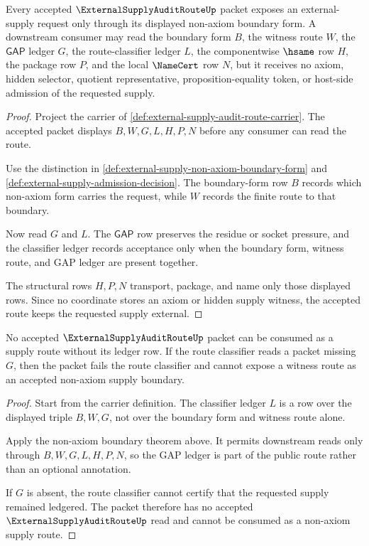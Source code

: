 \begin{theorem}
\label{thm:external-supply-audit-route-nonaxiom-boundary}
Every accepted $\ExternalSupplyAuditRouteUp$ packet exposes an external-supply request only through its displayed non-axiom boundary form. A downstream consumer may read the boundary form $B$, the witness route $W$, the $\mathsf{GAP}$ ledger $G$, the route-classifier ledger $L$, the componentwise $\hsame$ row $H$, the package row $P$, and the local $\NameCert$ row $N$, but it receives no axiom, hidden selector, quotient representative, proposition-equality token, or host-side admission of the requested supply.
\end{theorem}
\begin{proof}
Project the carrier of \autoref{def:external-supply-audit-route-carrier}. The accepted packet displays $B,W,G,L,H,P,N$ before any consumer can read the route.

Use the distinction in \autoref{def:external-supply-non-axiom-boundary-form} and \autoref{def:external-supply-admission-decision}. The boundary-form row $B$ records which non-axiom form carries the request, while $W$ records the finite route to that boundary.

Now read $G$ and $L$. The $\mathsf{GAP}$ row preserves the residue or socket pressure, and the classifier ledger records acceptance only when the boundary form, witness route, and GAP ledger are present together.

The structural rows $H,P,N$ transport, package, and name only those displayed rows. Since no coordinate stores an axiom or hidden supply witness, the accepted route keeps the requested supply external.
\end{proof}

\begin{theorem}
\label{thm:external-supply-audit-route-ledger-nonescape}
No accepted $\ExternalSupplyAuditRouteUp$ packet can be consumed as a supply route without its ledger row. If the route classifier reads a packet missing $G$, then the packet fails the route classifier and cannot expose a witness route as an accepted non-axiom supply boundary.
\end{theorem}
\begin{proof}
Start from the carrier definition. The classifier ledger $L$ is a row over the displayed triple $B,W,G$, not over the boundary form and witness route alone.

Apply the non-axiom boundary theorem above. It permits downstream reads only through $B,W,G,L,H,P,N$, so the GAP ledger is part of the public route rather than an optional annotation.

If $G$ is absent, the route classifier cannot certify that the requested supply remained ledgered. The packet therefore has no accepted $\ExternalSupplyAuditRouteUp$ read and cannot be consumed as a non-axiom supply route.
\end{proof}

